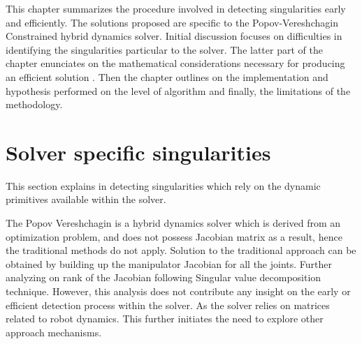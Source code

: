 This chapter summarizes the procedure involved in detecting singularities
early and efficiently. The solutions proposed are specific to the Popov-Vereshchagin Constrained hybrid dynamics solver. Initial discussion focuses on difficulties in identifying the singularities particular to the solver. The latter part of the chapter enunciates on the mathematical considerations necessary for producing an efficient solution . Then the chapter outlines on the implementation and hypothesis performed on the level of algorithm and finally, the limitations of the methodology.
\section{Solver specific singularities}

This section explains in detecting singularities which rely on the dynamic primitives available within the solver.

The Popov Vereshchagin is a hybrid dynamics solver which is derived from an optimization problem, and does not possess Jacobian matrix as a result, hence the traditional methods do not apply. Solution to the traditional approach can be obtained by building up the manipulator Jacobian for all the joints. Further analyzing on rank of the Jacobian following Singular value decomposition technique. However, this analysis does not contribute any insight on the early or efficient detection process within the solver. As the solver relies on matrices related to robot dynamics. This further initiates the need to explore other approach mechanisms. 


